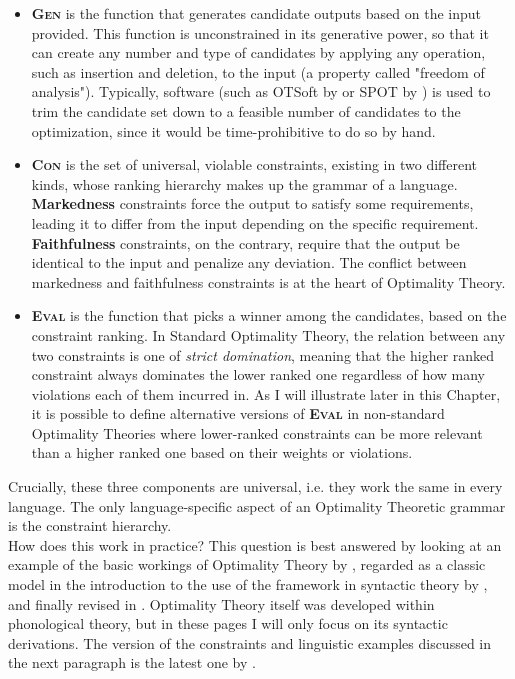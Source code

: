 \begin{itemize}
    \item \textsc{\textbf{Gen}} is the function that generates candidate outputs based on the input provided. This function is unconstrained in its generative power, so that it can create any number and type of candidates by applying any operation, such as insertion and deletion, to the input (a property called "freedom of analysis"). Typically, software (such as OTSoft by \textcite{hayes2003otsoft} or SPOT by \textcite{bellik2019automated}) is used to trim the candidate set down to a feasible number of candidates to the optimization, since it would be time-prohibitive to do so by hand.
    \item \textsc{\textbf{Con}} is the set of universal, violable constraints, existing in two different kinds, whose ranking hierarchy makes up the grammar of a language. \textbf{Markedness} constraints force the output to satisfy some requirements, leading it to differ from the input depending on the specific requirement. \textbf{Faithfulness} constraints, on the contrary, require that the output be identical to the input and penalize any deviation. The conflict between markedness and faithfulness constraints is at the heart of Optimality Theory.
    \item \textsc{\textbf{Eval}} is the function that picks a winner among the candidates, based on the constraint ranking. In Standard Optimality Theory, the relation between any two constraints is one of \textit{strict domination}, meaning that the higher ranked constraint always dominates the lower ranked one regardless of how many violations each of them incurred in. As I will illustrate later in this Chapter, it is possible to define alternative versions of \textsc{\textbf{Eval}} in non-standard Optimality Theories where lower-ranked constraints can be more relevant than a higher ranked one based on their weights or violations.
\end{itemize}
Crucially, these three components are universal, i.e. they work the same in every language. The only language-specific aspect of an Optimality Theoretic grammar is the constraint hierarchy.\\
How does this work in practice? This question is best answered by looking at an example of the basic workings of Optimality Theory by \textcite{grimshaw1998optimal}, regarded as a classic model in the introduction to the use of the framework in syntactic theory by \textcite{legendre2001introduction}, and finally revised in \textcite{legendre2019otsyntax}. Optimality Theory itself was developed \parencite{princesmolensky1993optimality} within phonological theory, but in these pages I will only focus on its syntactic derivations. The version of the constraints and linguistic examples discussed in the next paragraph is the latest one by \textcite{legendre2019otsyntax}. 

